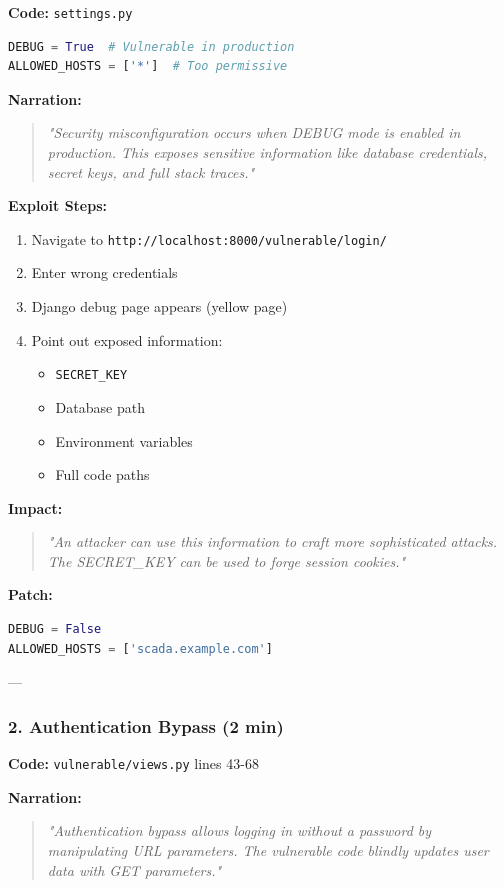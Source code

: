 \documentclass[12pt,a4paper]{article}
\begin{document}
\textbf{Code:} \texttt{settings.py}
\begin{lstlisting}[language=Python]
DEBUG = True  # Vulnerable in production
ALLOWED_HOSTS = ['*']  # Too permissive
\end{lstlisting}

\textbf{Narration:}
\begin{quote}
\textit{"Security misconfiguration occurs when DEBUG mode is enabled in production. This exposes sensitive information like database credentials, secret keys, and full stack traces."}
\end{quote}

\textbf{Exploit Steps:}
\begin{enumerate}
    \item Navigate to \texttt{http://localhost:8000/vulnerable/login/}
    \item Enter wrong credentials
    \item Django debug page appears (yellow page)
    \item Point out exposed information:
    \begin{itemize}
        \item \texttt{SECRET\_KEY}
        \item Database path
        \item Environment variables
        \item Full code paths
    \end{itemize}
\end{enumerate}

\textbf{Impact:}
\begin{quote}
\textit{"An attacker can use this information to craft more sophisticated attacks. The SECRET\_KEY can be used to forge session cookies."}
\end{quote}

\textbf{Patch:}
\begin{lstlisting}[language=Python]
DEBUG = False
ALLOWED_HOSTS = ['scada.example.com']
\end{lstlisting}

---

\subsubsection{2. Authentication Bypass (2 min)}

\textbf{Code:} \texttt{vulnerable/views.py} lines 43-68

\textbf{Narration:}
\begin{quote}
\textit{"Authentication bypass allows logging in without a password by manipulating URL parameters. The vulnerable code blindly updates user data with GET parameters."}
\end{quote}
\end{document}
